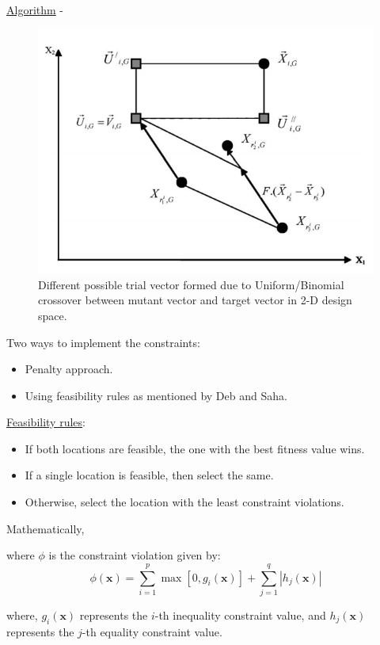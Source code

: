 \begin{frame}[allowframebreaks]{\underline{Algorithm} -}
{\begin{figure}
\includegraphics[scale = 0.18]{figures/crossover.png}
    \caption{Different possible trial vector formed due to Uniform/Binomial crossover between mutant vector and target vector in 2-D design space\cite{storn}.}
    \label{crossover}

\end{figure}
}
Two ways to implement the constraints:
\begin{itemize}
\item Penalty approach.
\item Using feasibility rules as mentioned by Deb and Saha\cite{Deb}.
\end{itemize}

\underline{Feasibility rules}:
\begin{itemize}
\item If both locations
are feasible, the one with the best fitness value wins.
\item If a single location is feasible, then
select the same.
\item Otherwise, select the location with the least constraint violations.
\end{itemize}
Mathematically,


where $\phi$ is the constraint violation given by:
\begin{equation}
\phi (\mathbf{x})=\sum_{i=1}^{p} \max \left[0, g_{i}(\mathbf{x})\right]+\sum_{j=1}^{q}\left|h_{j}(\mathbf{x})\right|
\end{equation}

where, $g_i(\textbf{x})$ represents the $i$-th inequality constraint value, and $h_j(\textbf{x})$ represents the $j$-th equality constraint value. 


\end{frame}
